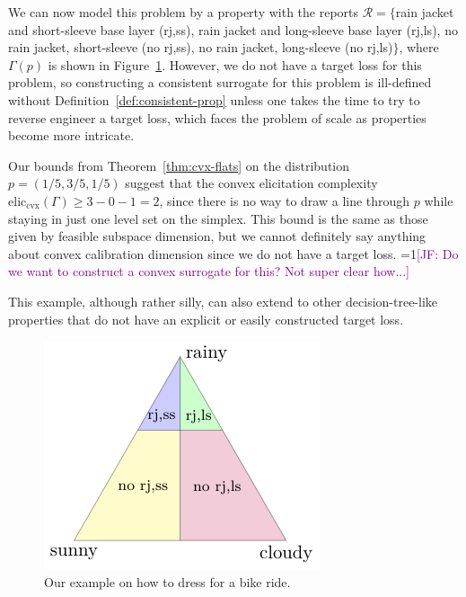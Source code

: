 \documentclass{article}
\newcommand{\Comments}{1}
\newcommand{\mynote}[2]{\ifnum\Comments=1\textcolor{#1}{#2}\fi}
\newcommand{\jessie}[1]{\mynote{purple}{[JF: #1]}}
\newcommand{\eliccvx}{\mathrm{elic}_\mathrm{cvx}}
\newcommand{\R}{\mathcal{R}}
\begin{document}
We can now model this problem by a property with the reports $\R = \{$rain jacket and short-sleeve base layer (rj,ss), rain jacket and long-sleeve base layer (rj,ls), no rain jacket, short-sleeve (no rj,ss), no rain jacket, long-sleeve (no rj,ls)$\}$, where $\Gamma(p)$ is shown in Figure~\ref{fig:t-example}.
However, we do not have a target loss for this problem, so constructing a consistent surrogate for this problem is ill-defined without Definition~\ref{def:consistent-prop} unless one takes the time to try to reverse engineer a target loss, which faces the problem of scale as properties become more intricate.

Our bounds from Theorem~\ref{thm:cvx-flats} on the distribution $p = (1/5, 3/5, 1/5)$ suggest that the convex elicitation complexity $\eliccvx(\Gamma) \geq 3 - 0 -1 = 2$, since there is no way to draw a line through $p$ while staying in just one level set on the simplex.
This bound is the same as those given by feasible subspace dimension, but we cannot definitely say anything about convex calibration dimension since we do not have a target loss.
\jessie{Do we want to construct a convex surrogate for this?  Not super clear how...}

This example, although rather silly, can also extend to other decision-tree-like properties that do not have an explicit or easily constructed target loss.

\begin{figure}
	\centering
	\includegraphics[width=0.4\linewidth]{tikz/t-example.pdf}
	\caption{Our example on how to dress for a bike ride.}
	\label{fig:t-example}
\end{figure}
\end{document}

